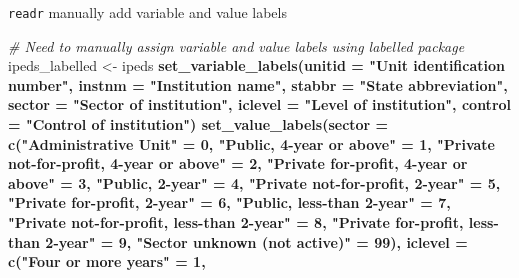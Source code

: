 \documentclass[8pt,ignorenonframetext,dvipsnames]{beamer}
\newenvironment{Shaded}{\begin{snugshade}}{\end{snugshade}}
\newcommand{\KeywordTok}[1]{\textcolor[rgb]{0.13,0.29,0.53}{\textbf{#1}}}
\newcommand{\DataTypeTok}[1]{\textcolor[rgb]{0.13,0.29,0.53}{#1}}
\newcommand{\DecValTok}[1]{\textcolor[rgb]{0.00,0.00,0.81}{#1}}
\newcommand{\StringTok}[1]{\textcolor[rgb]{0.31,0.60,0.02}{#1}}
\newcommand{\CommentTok}[1]{\textcolor[rgb]{0.56,0.35,0.01}{\textit{#1}}}
\newcommand{\OperatorTok}[1]{\textcolor[rgb]{0.81,0.36,0.00}{\textbf{#1}}}
\newcommand{\NormalTok}[1]{#1}
\renewcommand{\textbf}[1]{{\color{darkgray}\bfseries\fontfamily{Montserrat-TOsF}#1}}
\begin{document}
\begin{frame}[fragile]{\texttt{readr} manually add variable and value
labels}

\begin{Shaded}
\begin{Highlighting}[]
\CommentTok{# Need to manually assign variable and value labels using labelled package }
\NormalTok{ipeds_labelled <-}\StringTok{ }\NormalTok{ipeds }\OperatorTok{%>%}
\StringTok{  }\KeywordTok{set_variable_labels}\NormalTok{(}\DataTypeTok{unitid =} \StringTok{"Unit identification number"}\NormalTok{, }
                      \DataTypeTok{instnm =} \StringTok{"Institution name"}\NormalTok{, }
                      \DataTypeTok{stabbr =} \StringTok{"State abbreviation"}\NormalTok{,}
                      \DataTypeTok{sector =} \StringTok{"Sector of institution"}\NormalTok{,}
                      \DataTypeTok{iclevel =} \StringTok{"Level of institution"}\NormalTok{,}
                      \DataTypeTok{control =} \StringTok{"Control of institution"}\NormalTok{) }\OperatorTok{%>%}
\StringTok{  }\KeywordTok{set_value_labels}\NormalTok{(}\DataTypeTok{sector =} \KeywordTok{c}\NormalTok{(}\StringTok{"Administrative Unit"}\NormalTok{ =}\StringTok{ }\DecValTok{0}\NormalTok{, }
                              \StringTok{"Public, 4-year or above"}\NormalTok{ =}\StringTok{ }\DecValTok{1}\NormalTok{, }
                              \StringTok{"Private not-for-profit, 4-year or above"}\NormalTok{ =}\StringTok{ }\DecValTok{2}\NormalTok{,}
                              \StringTok{"Private for-profit, 4-year or above"}\NormalTok{ =}\StringTok{ }\DecValTok{3}\NormalTok{, }
                              \StringTok{"Public, 2-year"}\NormalTok{ =}\StringTok{ }\DecValTok{4}\NormalTok{, }
                              \StringTok{"Private not-for-profit, 2-year"}\NormalTok{ =}\StringTok{ }\DecValTok{5}\NormalTok{, }
                              \StringTok{"Private for-profit, 2-year"}\NormalTok{ =}\StringTok{ }\DecValTok{6}\NormalTok{,}
                              \StringTok{"Public, less-than 2-year"}\NormalTok{ =}\StringTok{ }\DecValTok{7}\NormalTok{, }
                              \StringTok{"Private not-for-profit, less-than 2-year"}\NormalTok{ =}\StringTok{ }\DecValTok{8}\NormalTok{,}
                              \StringTok{"Private for-profit, less-than 2-year"}\NormalTok{ =}\StringTok{ }\DecValTok{9}\NormalTok{, }
                              \StringTok{"Sector unknown (not active)"}\NormalTok{ =}\StringTok{ }\DecValTok{99}\NormalTok{), }
                   \DataTypeTok{iclevel =} \KeywordTok{c}\NormalTok{(}\StringTok{"Four or more years"}\NormalTok{ =}\StringTok{ }\DecValTok{1}\NormalTok{, }
}}
\end{Highlighting}
\end{Shaded}
\end{frame}
\end{document}
